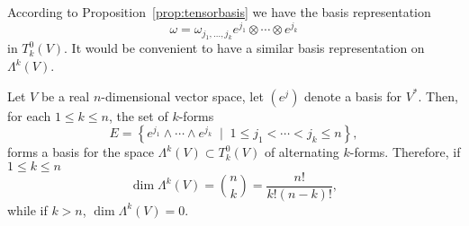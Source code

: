 According to Proposition~\ref{prop:tensorbasis} we have the basis representation
\begin{equation}
  \omega = \omega_{j_1, \ldots, j_k} e^{j_1}\otimes \cdots \otimes e^{j_k}
\end{equation}
in $T_k^0(V)$.
It would be convenient to have a similar basis representation on $\Lambda^k(V)$.

\begin{proposition}\label{prop:dimLkV}
  Let $V$ be a real $n$-dimensional vector space, let $(e^j)$ denote a basis for $V^*$.
  Then, for each $1\leq k \leq n$, the set of $k$-forms
  \begin{equation}
    E = \left\{
    e^{j_1}\wedge\cdots\wedge e^{j_k} \;\mid\; 1\leq j_1<\cdots<j_k\leq n
    \right\},
  \end{equation}
  forms a basis for the space $\Lambda^k(V) \subset T_k^0(V)$ of alternating $k$-forms.
  Therefore, if $1\leq k\leq n$
  \begin{equation}
    \dim \Lambda^k(V) = \binom{n}{k} = \frac{n!}{k!(n-k)!},
  \end{equation}
  while if $k>n$, $\dim \Lambda^k(V) = 0$.
\end{proposition}
